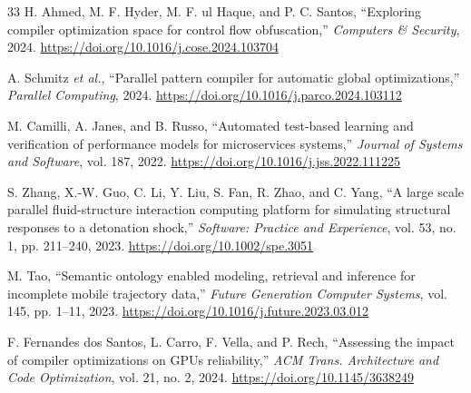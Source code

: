 \documentclass[conference]{IEEEtran}
\begin{document}
\begin{thebibliography}{33}
H. Ahmed, M. F. Hyder, M. F. ul Haque, and P. C. Santos,
``Exploring compiler optimization space for control flow obfuscation,''
\textit{Computers \& Security}, 2024.
\url{https://doi.org/10.1016/j.cose.2024.103704}

A. Schmitz \textit{et al.},
``Parallel pattern compiler for automatic global optimizations,''
\textit{Parallel Computing}, 2024.
\url{https://doi.org/10.1016/j.parco.2024.103112}

M. Camilli, A. Janes, and B. Russo,
``Automated test-based learning and verification of performance models for microservices systems,''
\textit{Journal of Systems and Software}, vol. 187, 2022.
\url{https://doi.org/10.1016/j.jss.2022.111225}

S. Zhang, X.-W. Guo, C. Li, Y. Liu, S. Fan, R. Zhao, and C. Yang,
``A large scale parallel fluid-structure interaction computing platform for simulating structural responses to a detonation shock,''
\textit{Software: Practice and Experience}, vol. 53, no. 1, pp. 211--240, 2023.
\url{https://doi.org/10.1002/spe.3051}

M. Tao,
``Semantic ontology enabled modeling, retrieval and inference for incomplete mobile trajectory data,''
\textit{Future Generation Computer Systems}, vol. 145, pp. 1--11, 2023.
\url{https://doi.org/10.1016/j.future.2023.03.012}

F. Fernandes dos Santos, L. Carro, F. Vella, and P. Rech,
``Assessing the impact of compiler optimizations on GPUs reliability,''
\textit{ACM Trans. Architecture and Code Optimization}, vol. 21, no. 2, 2024.
\url{https://doi.org/10.1145/3638249}

\end{thebibliography}
\end{document}
